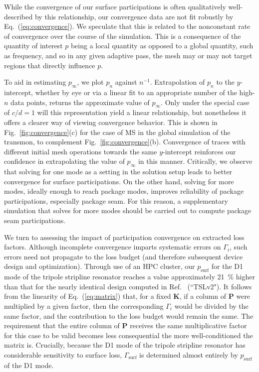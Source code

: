\documentclass[
    reprint,
    superscriptaddress,
    amsmath,amssymb,
    aps,
    prb,
    floatfix,
]{revtex4-2}
\begin{document}
While the convergence of our surface participations is often qualitatively well-described by this relationship, our convergence data are not fit robustly by Eq.~(\ref{eq:convergence}). We speculate that this is related to the nonconstant rate of convergence over the course of the simulation. This is a consequence of the quantity of interest $p$ being a local quantity as opposed to a global quantity, such as frequency, and so in any given adaptive pass, the mesh may or may not target regions that directly influence $p$.

To aid in estimating $p_\infty$, we plot $p_n$ against $n^{-1}$. Extrapolation of $p_n$ to the $y$-intercept, whether by eye or via a linear fit to an appropriate number of the high-$n$ data points, returns the approximate value of $p_\infty$. Only under the special case of $c/d=1$ will this representation yield a linear relationship, but nonetheless it offers a clearer way of viewing convergence behavior. This is shown in Fig.~\ref{fig:convergence}(c) for the case of MS in the global simulation of the transmon, to complement Fig.~\ref{fig:convergence}(b). Convergence of traces with different initial mesh operations towards the same $y$-intercept reinforces our confidence in extrapolating the value of $p_\infty$ in this manner. Critically, we observe that solving for one mode as a setting in the solution setup leads to better convergence for surface participations. On the other hand, solving for more modes, ideally enough to reach package modes, improves reliability of package participations, especially package seam. For this reason, a supplementary simulation that solves for more modes should be carried out to compute package seam participations.

We turn to assessing the impact of participation convergence on extracted loss factors. Although incomplete convergence imparts systematic errors on $\Gamma_i$, such errors need not propagate to the loss budget (and therefore subsequent device design and optimization). Through use of an HPC cluster, our $p_\mathrm{surf}$ for the D1 mode of the tripole stripline resonator reaches a value approximately \SI{21}{\percent} higher than that for the nearly identical design computed in Ref.~\cite{ganjam2024} (``TSLv2"). It follows from the linearity of Eq.~(\ref{eq:matrix}) that, for a fixed $\mathbf{K}$, if a column of $\mathbf{P}$ were multiplied by a given factor, then the corresponding $\Gamma_i$ would be divided by the same factor, and the contribution to the loss budget would remain the same. The requirement that the entire column of $\mathbf{P}$ receives the same multiplicative factor for this case to be valid becomes less consequential the more well-conditioned the matrix is. Crucially, because the D1 mode of the tripole stripline resonator has considerable sensitivity to surface loss, $\Gamma_\mathrm{surf}$ is determined almost entirely by $p_\mathrm{surf}$ of the D1 mode.
\end{document}
